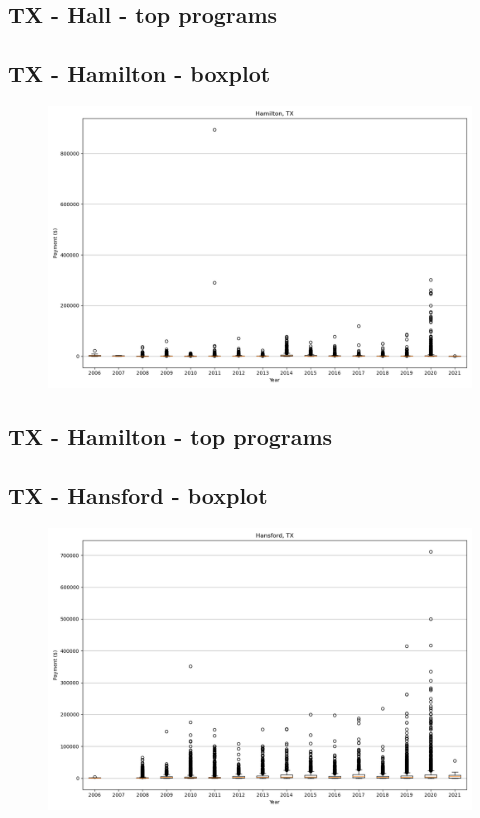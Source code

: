 \subsection*{TX - Hall - top programs}

\newpage
\subsection*{TX - Hamilton - boxplot}
\begin{figure}[h]
\centering
\includegraphics[width=7in]{../output/boxplots/counties/Hamilton-TX_boxplot.png}
\end{figure}


\subsection*{TX - Hamilton - top programs}

\newpage
\subsection*{TX - Hansford - boxplot}
\begin{figure}[h]
\centering
\includegraphics[width=7in]{../output/boxplots/counties/Hansford-TX_boxplot.png}
\end{figure}


